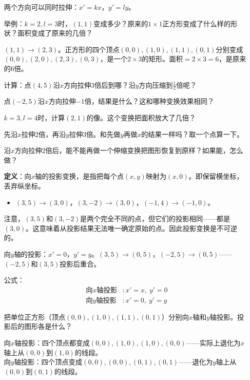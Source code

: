 两个方向可以同时拉伸：$x'=kx$，$y'=ly$。

\begin{example}
举例：$k=2,l=3$时，$(1,1)$变成多少？原来的$1\times1$正方形变成了什么样的形状？面积变成了原来的几倍？
\end{example}
\begin{solution}
$(1,1)\to(2,3)$。正方形的四个顶点$(0,0),(1,0),(1,1),(0,1)$分别变成$(0,0),(2,0),(2,3),(0,3)$，是一个$2\times3$的矩形。面积$=2\times3=6$，是原来的$6$倍。
\end{solution}

\begin{exercise}
\item 计算：点$(4,5)$沿$x$方向拉伸$3$倍后到哪？沿$y$方向压缩到$\frac12$倍呢？
\item 点$(-2,5)$沿$x$方向拉伸$-1$倍，结果是什么？这和哪种变换效果相同？
\item $k=3,l=4$时，计算$(2,1)$的像。这个变换把面积放大了几倍？
\item 先沿$x$拉伸$2$倍，再沿$y$拉伸$3$倍。和先做$y$再做$x$的结果一样吗？取一个点算一下。
\item 沿$x$方向拉伸$2$倍后，能不能再做一个伸缩变换把图形恢复到原样？如果能，怎么做？
\end{exercise}


\textbf{定义}：向$x$轴的投影变换，是指把每个点$(x,y)$映射为$(x,0)$。即保留横坐标，丢弃纵坐标。

\begin{itemize}
\item $(3,5)\to(3,0)$，$(3,-2)\to(3,0)$，$(-1,4)\to(-1,0)$。
\end{itemize}

注意，$(3,5)$和$(3,-2)$是两个完全不同的点，但它们的投影相同——都是$(3,0)$。这意味着从投影结果无法唯一确定原始的点。因此投影变换是不可逆的。

向$y$轴的投影：$x'=0$，$y'=y$。$(3,5)\to(0,5)$，$(-2,5)\to(0,5)$——$(-2,5)$和$(3,5)$投影后重合。

公式：
\begin{align*}
\text{向$x$轴投影}&: x'=x,\; y'=0\\
\text{向$y$轴投影}&: x'=0,\; y'=y
\end{align*}

\begin{example}
把单位正方形（顶点$(0,0),(1,0),(1,1),(0,1)$）分别向$x$轴和$y$轴投影。投影后的图形各是什么？
\end{example}
\begin{solution}
向$x$轴投影：四个顶点都变成$(0,0),(1,0),(1,0),(0,0)$——实际上退化为$x$轴上从$(0,0)$到$(1,0)$的线段。\\
向$y$轴投影：四个顶点变成$(0,0),(0,0),(0,1),(0,1)$——退化为$y$轴上从$(0,0)$到$(0,1)$的线段。
\end{solution}

